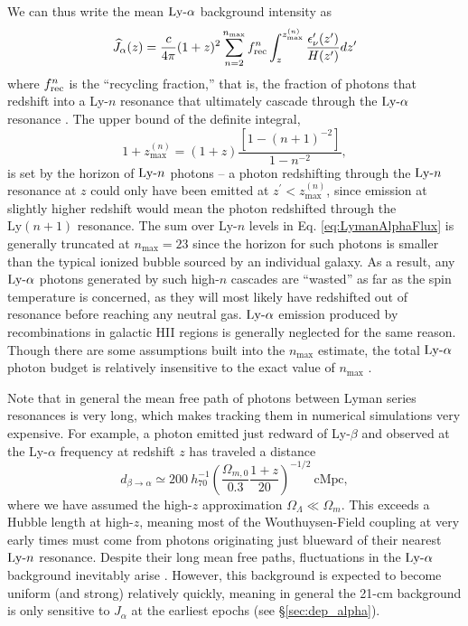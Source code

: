 We can thus write the mean $\text{Ly-}\alpha$ background intensity as
\begin{equation}
    \widehat{J}_{\alpha}(z) = \frac{c}{4\pi} (1 + z)^2 \sum_{n = 2}^{n_{\text{max}}} f_{\text{rec}}^{n} \int_z^{z_{\max}^{(n)}} \frac{\epsilon_{\nu}^{\prime}(z^{\prime})}{H(z^{\prime})} dz^{\prime} \label{eq:LymanAlphaFlux}
\end{equation}
where $f_{\text{rec}}^{n}$ is the ``recycling fraction,'' that is, the fraction of photons that redshift into a Ly-$n$ resonance that ultimately cascade through the $\text{Ly-}\alpha$ resonance \cite{Pritchard2006}. The upper bound of the definite integral,
\begin{equation}
    1 + z_{\max}^{(n)} = (1 + z) \frac{\left[1 - (n + 1)^{-2}\right]}{1 - n^{-2}} ,
\end{equation}
is set by the horizon of $\text{Ly-}n$ photons -- a photon redshifting through the  $\text{Ly-}n$ resonance at $z$ could only have been emitted at $z^{\prime} < z_{\max}^{(n)}$, since emission at slightly higher redshift would mean the photon redshifted through the $\text{Ly}(n+1)$ resonance. The sum over Ly-$n$ levels in Eq. \ref{eq:LymanAlphaFlux} is generally truncated at $n_{\max}=23$ \cite{Barkana2005} since the horizon for such photons is smaller than the typical ionized bubble sourced by an individual galaxy. As a result, any $\text{Ly-}\alpha$ photons generated by such high-$n$ cascades are ``wasted'' as far as the spin temperature is concerned, as they will most likely have redshifted out of resonance before reaching any neutral gas. $\text{Ly-}\alpha$ emission produced by recombinations in galactic HII regions is generally neglected for the same reason. Though there are some assumptions built into the $n_{\max}$ estimate, the total $\text{Ly-}\alpha$ photon budget is relatively insensitive to the exact value of $n_{\max}$ \cite{Barkana2005,Pritchard2006}.

Note that in general the mean free path of photons between Lyman series resonances is very long, which makes tracking them in numerical simulations  very expensive. For example, a photon emitted just redward of Ly-$\beta$ and observed at the Ly-$\alpha$ frequency at redshift $z$ has traveled a distance
\begin{equation}
	d_{\beta\rightarrow \alpha} \simeq 200 \ h_{70}^{-1} \left(\frac{\Omega_{m,0}}{0.3} \frac{1+z}{20} \right)^{-1/2} \ \mathrm{cMpc},
\end{equation}
where we have assumed the high-$z$ approximation $\Omega_{\Lambda} \ll \Omega_m$. This exceeds a Hubble length at high-$z$, meaning most of the Wouthuysen-Field coupling at very early times must come from photons originating just blueward of their nearest $\text{Ly-}n$ resonance. Despite their long mean free paths, fluctuations in the $\text{Ly-}\alpha$ background inevitably arise \cite{Barkana2005,Ahn2009,Holzbauer2012}. However, this background is expected to become uniform (and strong) relatively quickly, meaning in general the 21-cm background is only sensitive to $J_{\alpha}$ at the earliest epochs (see \S\ref{sec:dep_alpha}).


